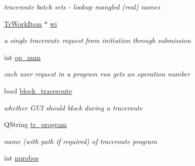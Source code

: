 \begin{CompactItemize}
\begin{CompactList}\small\item\em traceroute batch sets - lookup mangled (real) names \item\end{CompactList}\item 
\hypertarget{classTrDo_9c11a7c66a32d3252f8533f0c5026237}{
\hyperlink{classTrWorkItem}{TrWorkItem} $\ast$ \hyperlink{classTrDo_9c11a7c66a32d3252f8533f0c5026237}{wi}}
\label{classTrDo_9c11a7c66a32d3252f8533f0c5026237}

\begin{CompactList}\small\item\em a single traceroute request from initiation through submission \item\end{CompactList}\item 
\hypertarget{classTrDo_7191eabfb34969b212cc63781de586f9}{
int \hyperlink{classTrDo_7191eabfb34969b212cc63781de586f9}{op\_\-num}}
\label{classTrDo_7191eabfb34969b212cc63781de586f9}

\begin{CompactList}\small\item\em each user request in a program run gets an operation number \item\end{CompactList}\item 
\hypertarget{classTrDo_f9570c10c1029e9df3fe044a72e13249}{
bool \hyperlink{classTrDo_f9570c10c1029e9df3fe044a72e13249}{block\_\-traceroute}}
\label{classTrDo_f9570c10c1029e9df3fe044a72e13249}

\begin{CompactList}\small\item\em whether GUI should block during a traceroute \item\end{CompactList}\item 
\hypertarget{classTrDo_0b464e12aed35a144ed6f70b9dac02d1}{
QString \hyperlink{classTrDo_0b464e12aed35a144ed6f70b9dac02d1}{tr\_\-program}}
\label{classTrDo_0b464e12aed35a144ed6f70b9dac02d1}

\begin{CompactList}\small\item\em name (with path if required) of traceroute program \item\end{CompactList}\item 
\hypertarget{classTrDo_a43925bacf574ca618a5797e46eba746}{
int \hyperlink{classTrDo_a43925bacf574ca618a5797e46eba746}{nprobes}}
\label{classTrDo_a43925bacf574ca618a5797e46eba746}


\end{CompactItemize}
